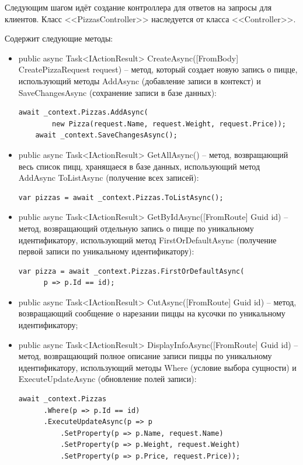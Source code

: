 \documentclass[a4paper,14pt]{extarticle}
\begin{document}
Следующим шагом идёт создание контроллера для ответов на запросы для клиентов. Класс <<PizzasController>> наследуется от класса <<Controller>>.

Содержит следующие методы:
\begin{itemize}
  \item[--] public async Task<IActionResult> CreateAsync([FromBody] CreatePizzaRequest request) -- метод, который создает новую запись о пицце, использующий методы AddAsync (добавление записи в контекст) и SaveChangesAsync (сохранение записи в базе данных):
  \begin{Verbatim}[tabsize=4]
    await _context.Pizzas.AddAsync(
        new Pizza(request.Name, request.Weight, request.Price));
    await _context.SaveChangesAsync();
  \end{Verbatim}
  \item[--] public async Task<IActionResult> GetAllAsync() -- метод, возвращающий весь список пицц, хранящаеся в базе данных, использующий метод AddAsync ToListAsync (получение всех записей):
  \begin{Verbatim}[tabsize=4]
    var pizzas = await _context.Pizzas.ToListAsync();
  \end{Verbatim}
  \item[--] public async Task<IActionResult> GetByIdAsync([FromRoute] Guid id) -- метод, возвращающий отдельную запись о пицце по уникальному идентификатору, использующий метод FirstOrDefaultAsync (получение первой записи по уникальному идентификатору):
  \begin{Verbatim}[tabsize=4]
    var pizza = await _context.Pizzas.FirstOrDefaultAsync(
      p => p.Id == id);
  \end{Verbatim}
  \item[--] public async Task<IActionResult> CutAsync([FromRoute] Guid id) -- метод, возвращающий сообщение о нарезании пиццы на кусочки по уникальному идентификатору;
  \item[--] public async Task<IActionResult> DisplayInfoAsync([FromRoute] Guid id) -- метод, возвращающий полное описание записи пиццы по уникальному идентификатору, использующий методы  Where (условие выбора сущности) и ExecuteUpdateAsync (обновление полей записи):
  \begin{Verbatim}[tabsize=4]
    await _context.Pizzas
      .Where(p => p.Id == id)
      .ExecuteUpdateAsync(p => p
          .SetProperty(p => p.Name, request.Name)
          .SetProperty(p => p.Weight, request.Weight)
          .SetProperty(p => p.Price, request.Price));
  \end{Verbatim}

\end{itemize}
\end{document}
